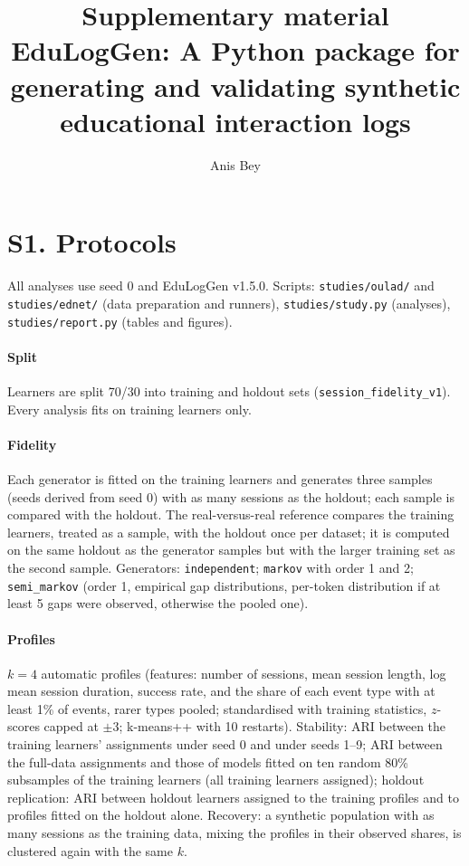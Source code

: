 \documentclass[11pt]{article}
\title{Supplementary material\\[0.3em]\large EduLogGen: A Python package for generating and validating synthetic educational interaction logs}
\author{Anis Bey}
\date{}
\begin{document}
\maketitle

\section*{S1. Protocols}

All analyses use seed 0 and EduLogGen v1.5.0. Scripts:
\texttt{studies/oulad/} and \texttt{studies/ednet/} (data preparation and
runners), \texttt{studies/study.py} (analyses), \texttt{studies/report.py}
(tables and figures).

\paragraph{Split} Learners are split 70/30 into training and holdout sets
(\texttt{session\_fidelity\_v1}). Every analysis fits on training learners
only.

\paragraph{Fidelity} Each generator is fitted on the training learners and
generates three samples (seeds derived from seed 0) with as many sessions as
the holdout; each sample is compared with the holdout. The real-versus-real
reference compares the training learners, treated as a sample, with the
holdout once per dataset; it is computed on the same holdout as the
generator samples but with the larger training set as the second sample.
Generators: \texttt{independent}; \texttt{markov} with order 1 and 2;
\texttt{semi\_markov} (order 1, empirical gap distributions, per-token
distribution if at least 5 gaps were observed, otherwise the pooled one).

\paragraph{Profiles} $k=4$ automatic profiles (features: number of sessions,
mean session length, log mean session duration, success rate, and the share
of each event type with at least 1\% of events, rarer types pooled;
standardised with training statistics, $z$-scores capped at $\pm3$;
k-means++ with 10 restarts). Stability: ARI between the training learners'
assignments under seed 0 and under seeds 1--9; ARI between the full-data
assignments and those of models fitted on ten random 80\% subsamples of the
training learners (all training learners assigned); holdout replication: ARI
between holdout learners assigned to the training profiles and to profiles
fitted on the holdout alone. Recovery: a synthetic population with as many
sessions as the training data, mixing the profiles in their observed shares,
is clustered again with the same $k$.
\end{document}
